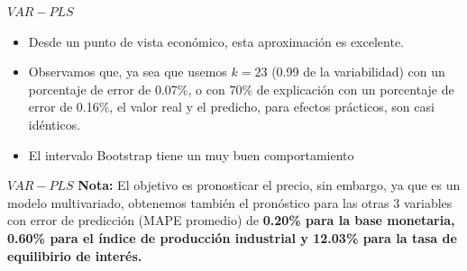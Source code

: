 \documentclass{beamer}
\newcommand{\?}{?`}
\begin{document}
\begin{frame}{$VAR-PLS$}
  \begin{figure}[htbp]
  \end{figure}
  \begin{footnotesize}
    \begin{itemize}
    \item Desde un punto de vista econ\'omico, esta aproximaci\'on es
      excelente. 
    \item Observamos que, ya sea que usemos $k=23$ (0.99 de la
      variabilidad) con un porcentaje de error de 0.07\%, o con 70\%
      de explicaci\'on con un porcentaje de error de 0.16\%, el valor
      real y el predicho, para efectos pr\'acticos, son casi
      id\'enticos.
    \item El intervalo Bootstrap tiene un muy buen comportamiento
    \end{itemize}
  \end{footnotesize}
\end{frame}

\begin{frame}{$VAR-PLS$}
  \textbf{Nota: }El objetivo es pronosticar el precio, sin embargo, ya
  que es un modelo multivariado, obtenemos tambi\'en el pron\'ostico
  para las otras 3 variables con error de predicci\'on (MAPE promedio)
  de \textbf{0.20\% para la base monetaria, 0.60\% para el \'indice de
    producci\'on industrial y 12.03\% para la tasa de equilibirio de
    inter\'es.}
\end{frame}
\end{document}
